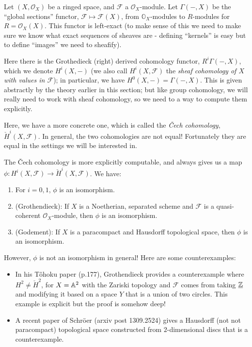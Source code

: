 \begin{example}
Let $(X,\mathcal{O}_X)$ be a ringed space, and $\mathcal{F}$ a $\mathcal{O}_X$-module. Let $\Gamma(-,X)$ be the ``global sections'' functor, $\mathcal{F}\mapsto \mathcal{F}(X)$, from $\mathbb{O}_X$-modules to $R$-modules for $R=\mathcal{O}_X(X)$. This functor is left-exact (to make sense of this we need to make sure we know what exact sequences of sheaves are - defining ``kernels'' is easy but to define ``images'' we need to sheafify). 

Here there is the Grothedieck (right) derived cohomology functor, $R^i\Gamma(-,X)$, which we denote $H^i(X,-)$ (we also call $H^i(X,\mathcal{F})$ the \emph{sheaf cohomology of $X$ with values in $\mathcal{F}$}); in particular, we have $H^0(X,-)=\Gamma(-,X)$. This is given abstractly by the theory earlier in this section; but like group cohomology, we will really need to work with sheaf cohomology, so we need to a way to compute them explicitly.

Here, we have a more concrete one, which is called the \emph{\v{C}ech cohomology}, $\check{H}^i(X,\mathcal{F})$. In general, the two cohomologies are not equal! Fortunately they are equal in the settings we will be interested in. 

The \v{C}ech cohomology is more explicitly computable, and always gives us a map $\phi: H^i(X,\mathcal{F})\to \check{H}^i(X,\mathcal{F})$. We have:

\begin{enumerate}
\item For $i=0,1$, $\phi$ is an isomorphism.
\item (Grothendieck): If $X$ is a Noetherian, separated scheme and $\mathcal{F}$ is a quasi-coherent $\mathcal{O}_X$-module, then $\phi$ is an isomorphism. 
\item (Godement): If $X$ is a paracompact and Hausdorff topological space, then $\phi$ is an isomorphism.
\end{enumerate}

However, $\phi$ is not an isomorphism in general! Here are some counterexamples:

\begin{itemize}
\item In his T\^{o}hoku paper (p.177), Grothendieck provides a counterexample where $H^2\not= \check{H}^2$, for $X={\mathbb A}^2$ with the Zariski topology and $\mathcal{F}$ comes from taking $\underline{{\mathbb Z}}$ and modifying it based on a space $Y$ that is a union of two circles. This example is explicit but the proof is somehow deep!
\item A recent paper of Schr\"{o}er (arxiv post 1309.2524) gives a Hausdorff (not not paracompact) topological space constructed from $2$-dimensional discs that is a counterexample. 
\end{itemize}


\end{example}
